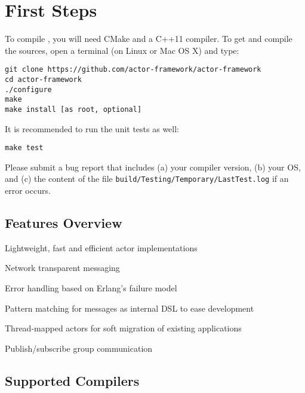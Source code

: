 \section{First Steps}



To compile \lib, you will need CMake and a C++11 compiler. To get and compile the sources, open a terminal (on Linux or Mac OS X) and type:

\begin{verbatim}
git clone https://github.com/actor-framework/actor-framework
cd actor-framework
./configure
make
make install [as root, optional]
\end{verbatim}

It is recommended to run the unit tests as well:

\begin{verbatim}
make test
\end{verbatim}

Please submit a bug report that includes (a) your compiler version, (b) your OS, and (c) the content of the file \texttt{build/Testing/Temporary/LastTest.log} if an error occurs.

\subsection{Features Overview}

\begin{itemize*}
  \item Lightweight, fast and efficient actor implementations
  \item Network transparent messaging
  \item Error handling based on Erlang's failure model
  \item Pattern matching for messages as internal DSL to ease development
  \item Thread-mapped actors for soft migration of existing applications
  \item Publish/subscribe group communication
\end{itemize*}


\subsection{Supported Compilers}

